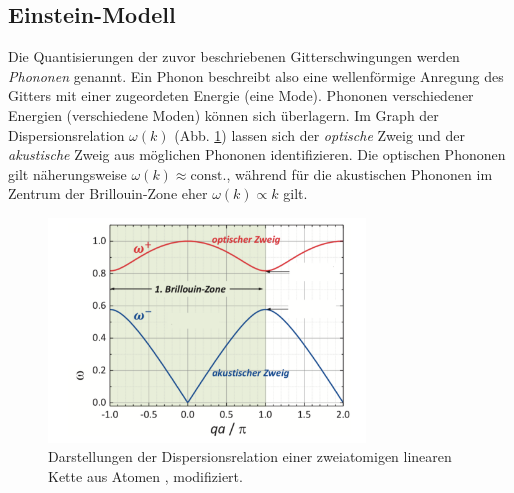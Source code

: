 \FloatBarrier
\subsection{Einstein-Modell}
Die Quantisierungen der zuvor beschriebenen Gitterschwingungen werden \textit{Phononen} genannt.
Ein Phonon beschreibt also eine wellenförmige Anregung des Gitters mit einer zugeordeten Energie (eine Mode).
Phononen verschiedener Energien (verschiedene Moden) können sich überlagern.
Im Graph der Dispersionsrelation $\omega(k)$ (Abb. \ref{fig:disp}) lassen sich der \textit{optische} Zweig und der \textit{akustische} Zweig aus möglichen Phononen identifizieren.
Die optischen Phononen gilt näherungsweise $\omega(k) \approx \text{const.}$, während für die akustischen Phononen im Zentrum der Brillouin-Zone eher $\omega(k) \propto k $ gilt.
\begin{figure}[!ht]
	\centering
	\includegraphics[width=0.75\textwidth]{content/images/phononen.pdf}
    \caption{Darstellungen der Dispersionsrelation einer zweiatomigen linearen Kette aus Atomen \cite{grossmarx}, modifiziert.}
    \label{fig:disp}
\end{figure}


